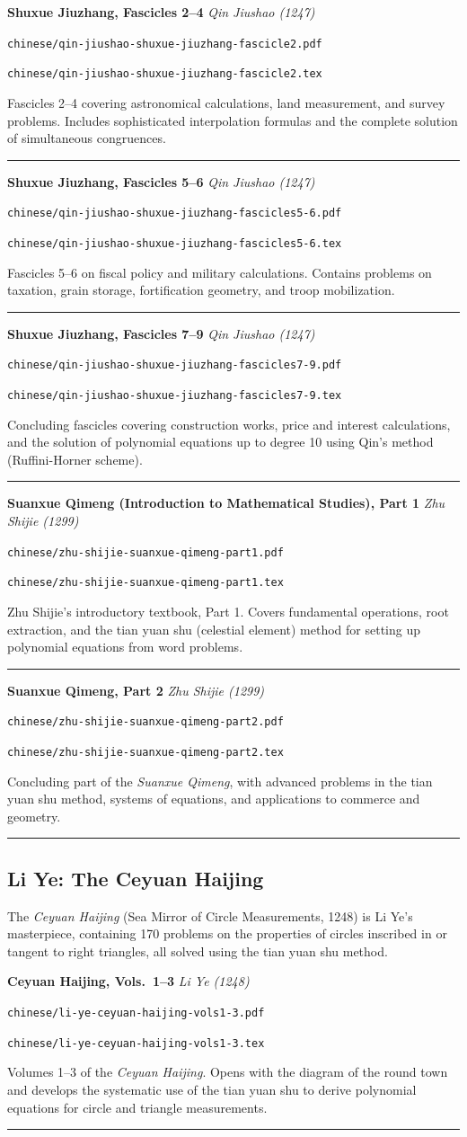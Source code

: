 \documentclass[11pt,a4paper]{article}
\newcommand{\workitem}[5]{%
  \par\smallskip
  \noindent\textbf{\large #1} \hfill \textit{#2}\par
  \noindent\texttt{\small #3}\par
  \noindent\texttt{\small #4}\par
  \noindent #5\par
  \smallskip\noindent\rule{\textwidth}{0.2pt}
}
\begin{document}
\workitem
  {Shuxue Jiuzhang, Fascicles 2--4}
  {Qin Jiushao (1247)}
  {chinese/qin-jiushao-shuxue-jiuzhang-fascicle2.pdf}
  {chinese/qin-jiushao-shuxue-jiuzhang-fascicle2.tex}
  {Fascicles 2--4 covering astronomical calculations, land measurement, and survey problems. Includes sophisticated interpolation formulas and the complete solution of simultaneous congruences.}

\workitem
  {Shuxue Jiuzhang, Fascicles 5--6}
  {Qin Jiushao (1247)}
  {chinese/qin-jiushao-shuxue-jiuzhang-fascicles5-6.pdf}
  {chinese/qin-jiushao-shuxue-jiuzhang-fascicles5-6.tex}
  {Fascicles 5--6 on fiscal policy and military calculations. Contains problems on taxation, grain storage, fortification geometry, and troop mobilization.}

\workitem
  {Shuxue Jiuzhang, Fascicles 7--9}
  {Qin Jiushao (1247)}
  {chinese/qin-jiushao-shuxue-jiuzhang-fascicles7-9.pdf}
  {chinese/qin-jiushao-shuxue-jiuzhang-fascicles7-9.tex}
  {Concluding fascicles covering construction works, price and interest calculations, and the solution of polynomial equations up to degree 10 using Qin's method (Ruffini-Horner scheme).}

\workitem
  {Suanxue Qimeng (Introduction to Mathematical Studies), Part 1}
  {Zhu Shijie (1299)}
  {chinese/zhu-shijie-suanxue-qimeng-part1.pdf}
  {chinese/zhu-shijie-suanxue-qimeng-part1.tex}
  {Zhu Shijie's introductory textbook, Part 1. Covers fundamental operations, root extraction, and the tian yuan shu (celestial element) method for setting up polynomial equations from word problems.}

\workitem
  {Suanxue Qimeng, Part 2}
  {Zhu Shijie (1299)}
  {chinese/zhu-shijie-suanxue-qimeng-part2.pdf}
  {chinese/zhu-shijie-suanxue-qimeng-part2.tex}
  {Concluding part of the \textit{Suanxue Qimeng}, with advanced problems in the tian yuan shu method, systems of equations, and applications to commerce and geometry.}

\subsection*{Li Ye: The Ceyuan Haijing}

The \textit{Ceyuan Haijing} (Sea Mirror of Circle Measurements, 1248) is Li Ye's masterpiece, containing 170 problems on the properties of circles inscribed in or tangent to right triangles, all solved using the tian yuan shu method.

\workitem
  {Ceyuan Haijing, Vols.~1--3}
  {Li Ye (1248)}
  {chinese/li-ye-ceyuan-haijing-vols1-3.pdf}
  {chinese/li-ye-ceyuan-haijing-vols1-3.tex}
  {Volumes 1--3 of the \textit{Ceyuan Haijing}. Opens with the diagram of the round town and develops the systematic use of the tian yuan shu to derive polynomial equations for circle and triangle measurements.}
\end{document}
